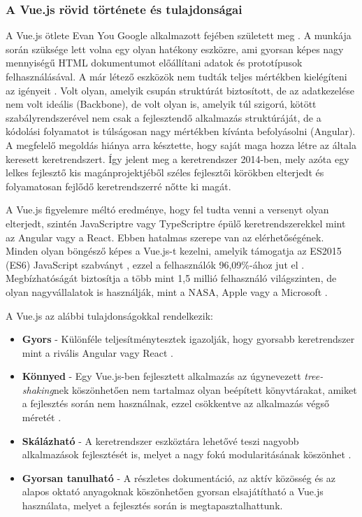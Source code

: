 \documentclass[12pt]{article}
\begin{document}
\subsubsection{A Vue.js rövid története és tulajdonságai}

A Vue.js ötlete Evan You Google alkalmazott fejében született meg \cite{VUE_BOOK}. A munkája során szüksége lett volna egy olyan hatékony eszközre, ami gyorsan képes nagy mennyiségű HTML dokumentumot előállítani adatok és prototípusok felhasználásával. A már létező eszközök nem tudták teljes mértékben kielégíteni az igényeit \cite{VUE_BOOK}. Volt olyan, amelyik csupán struktúrát biztosított, de az adatkezelése nem volt ideális (Backbone), de volt olyan is, amelyik túl szigorú, kötött szabályrendszerével nem csak a fejlesztendő alkalmazás struktúráját, de a kódolási folyamatot is túlságosan nagy mértékben kívánta befolyásolni (Angular). A megfelelő megoldás hiánya arra késztette, hogy saját maga hozza létre az általa keresett keretrendszert. Így jelent meg a keretrendszer 2014-ben, mely azóta egy lelkes fejlesztő kis magánprojektjéből széles fejlesztői körökben elterjedt és folyamatosan fejlődő keretrendszerré nőtte ki magát.

A Vue.js figyelemre méltó eredménye, hogy fel tudta venni a versenyt olyan elterjedt, szintén JavaScriptre vagy TypeScriptre épülő keretrendszerekkel mint az Angular vagy a React. Ebben hatalmas szerepe van az elérhetőségének. Minden olyan böngésző képes a Vue.js-t kezelni, amelyik támogatja az ES2015 (ES6) JavaScript szabványt \cite{VUE_SUPP}, ezzel a felhasználók 96,09\%-ához jut el \cite{ES2015_USAGE}. Megbízhatóságát biztosítja a több mint 1,5 millió felhasználó világszinten, de olyan nagyvállalatok is használják, mint a NASA, Apple vagy a Microsoft \cite{VUE_COMPANIES}.

A Vue.js az alábbi tulajdonságokkal rendelkezik:
\begin{itemize}
	\item[]\textbf{Gyors}
	- Különféle teljesítménytesztek igazolják, hogy gyorsabb keretrendszer mint a rivális Angular vagy React \cite{FRAMEWORK_PERF}.
	\item[]\textbf{Könnyed}
	- Egy Vue.js-ben fejlesztett alkalmazás az úgynevezett \textit{tree-shaking}nek köszönhetően nem tartalmaz olyan beépített könyvtárakat, amiket a fejlesztés során nem használnak, ezzel csökkentve az alkalmazás végső méretét \cite{VUE_LW}.
	\item[]\textbf{Skálázható}
	- A keretrendszer eszköztára lehetővé teszi nagyobb alkalmazások fejlesztését is, melyet a nagy fokú modularitásának köszönhet \cite{VUE_SCALE}.
	\item[]\textbf{Gyorsan tanulható}
	- A részletes dokumentáció, az aktív közösség és az alapos oktató anyagoknak köszönhetően gyorsan elsajátítható a Vue.js használata, melyet a fejlesztés során is megtapasztalhattunk.
\end{itemize}
\end{document}
